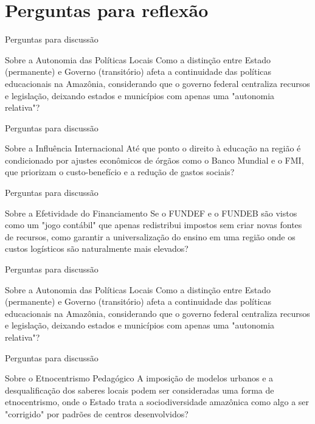 \documentclass[12pt]{beamer}
\begin{document}
	\section{Perguntas para reflexão}
	
		\begin{frame}{Perguntas para discussão}
			\begin{block}{Sobre a Autonomia das Políticas Locais}
				\justifying
				Como a distinção entre Estado (permanente) e Governo (transitório) afeta a continuidade das políticas educacionais na Amazônia, considerando que o governo federal centraliza recursos e legislação, deixando estados e municípios com apenas uma "autonomia relativa"?
			\end{block}
		\end{frame}
		
		\begin{frame}{Perguntas para discussão}
			\begin{block}{Sobre a Influência Internacional}
				\justifying
				Até que ponto o direito à educação na região é condicionado por ajustes econômicos de órgãos como o Banco Mundial e o FMI, que priorizam o custo-benefício e a redução de gastos sociais?
			\end{block}
		\end{frame}
		
		\begin{frame}{Perguntas para discussão}
			\begin{block}{Sobre a Efetividade do Financiamento}
				\justifying
				Se o FUNDEF e o FUNDEB são vistos como um "jogo contábil" que apenas redistribui impostos sem criar novas fontes de recursos, como garantir a universalização do ensino em uma região onde os custos logísticos são naturalmente mais elevados?
			\end{block}
		\end{frame}
		
		\begin{frame}{Perguntas para discussão}
			\begin{block}{Sobre a Autonomia das Políticas Locais}
				\justifying
				Como a distinção entre Estado (permanente) e Governo (transitório) afeta a continuidade das políticas educacionais na Amazônia, considerando que o governo federal centraliza recursos e legislação, deixando estados e municípios com apenas uma "autonomia relativa"?
			\end{block}
		\end{frame}
		
		\begin{frame}{Perguntas para discussão}
			\begin{block}{Sobre o Etnocentrismo Pedagógico}
				\justifying
				A imposição de modelos urbanos e a desqualificação dos saberes locais podem ser consideradas uma forma de etnocentrismo, onde o Estado trata a sociodiversidade amazônica como algo a ser "corrigido" por padrões de centros desenvolvidos?
			\end{block}
		\end{frame}
		
\end{document}
